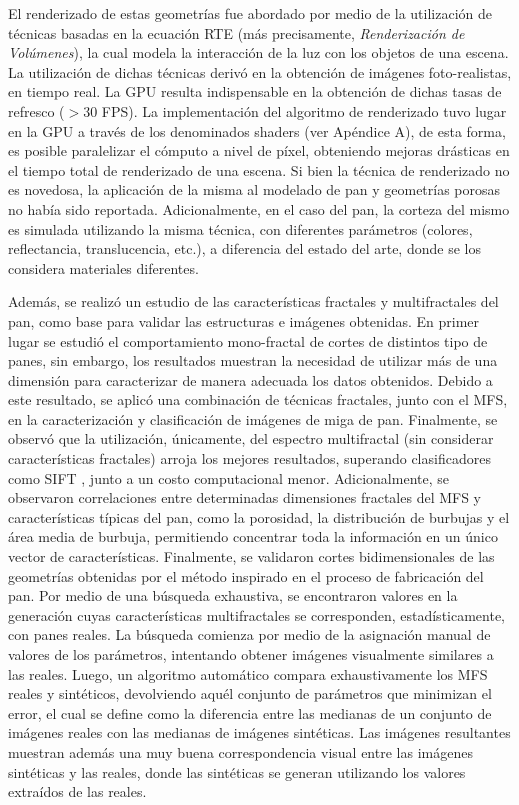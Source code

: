 El renderizado de estas geometrías fue abordado por medio de la utilización de técnicas basadas en la ecuación RTE (más precisamente, {\em Renderización de Volúmenes}), la cual modela la interacción de la luz con los objetos de una escena.
La utilización de dichas técnicas derivó en la obtención de imágenes foto-realistas, en tiempo real.
La GPU resulta indispensable en la obtención de dichas tasas de refresco ($> 30 $ FPS).
La implementación del algoritmo de renderizado tuvo lugar en la GPU a través de los denominados shaders (ver Apéndice A), de esta forma, es posible paralelizar el cómputo a nivel de píxel, obteniendo mejoras drásticas en el tiempo total de renderizado de una escena.
Si bien la técnica de renderizado no es novedosa, la aplicación de la misma al modelado de pan y geometrías porosas no había sido reportada.
Adicionalmente, en el caso del pan, la corteza del mismo es simulada utilizando la misma técnica, con diferentes parámetros (colores, reflectancia, translucencia, etc.), a diferencia del estado del arte, donde se los considera materiales diferentes.


Además, se realizó un estudio de las características fractales y multifractales del pan, como base para validar las estructuras e imágenes obtenidas.
En primer lugar se estudió el comportamiento mono-fractal de cortes de distintos tipo de panes, sin embargo, los resultados muestran la necesidad de utilizar más de una dimensión para caracterizar de manera adecuada los datos obtenidos.
Debido a este resultado, se aplicó una combinación de técnicas fractales, junto con el MFS, en la caracterización y clasificación de imágenes de miga de pan. Finalmente, se observó que la utilización, únicamente, del espectro multifractal (sin considerar características fractales) arroja los mejores resultados, superando clasificadores como SIFT \cite{Lowe2004}, junto a un costo computacional menor.
Adicionalmente, se observaron correlaciones entre determinadas dimensiones fractales del MFS y características típicas del pan, como la porosidad, la distribución de burbujas y el área media de burbuja, permitiendo concentrar toda la información en un único vector de características.
Finalmente, se validaron cortes bidimensionales de las geometrías obtenidas por el método inspirado en el proceso de fabricación del pan.
Por medio de una búsqueda exhaustiva, se encontraron valores en la generación cuyas características multifractales se corresponden, estadísticamente, con panes reales.
La búsqueda comienza por medio de la asignación manual de valores de los parámetros, intentando obtener imágenes visualmente similares a las reales.
Luego, un algoritmo automático compara exhaustivamente los MFS reales y sintéticos, devolviendo aquél conjunto de parámetros que minimizan el error, el cual se define como la diferencia entre las medianas de un conjunto de imágenes reales con las medianas de imágenes sintéticas.
Las imágenes resultantes muestran además una muy buena correspondencia visual entre las imágenes sintéticas y las reales, donde las sintéticas se generan utilizando los valores extraídos de las reales.

